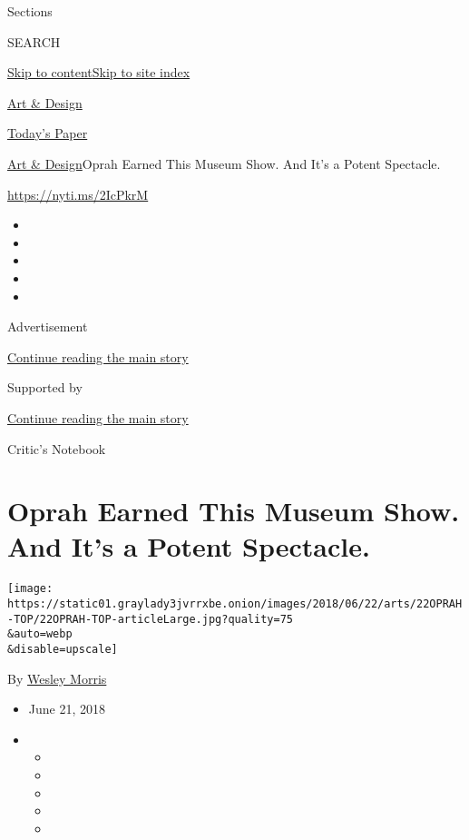 Sections

SEARCH

\protect\hyperlink{site-content}{Skip to
content}\protect\hyperlink{site-index}{Skip to site index}

\href{https://www.nytimes3xbfgragh.onion/section/arts/design}{Art \&
Design}

\href{https://myaccount.nytimes3xbfgragh.onion/auth/login?response_type=cookie\&client_id=vi}{}

\href{https://www.nytimes3xbfgragh.onion/section/todayspaper}{Today's
Paper}

\href{/section/arts/design}{Art \& Design}\textbar{}Oprah Earned This
Museum Show. And It's a Potent Spectacle.

\url{https://nyti.ms/2IcPkrM}

\begin{itemize}
\item
\item
\item
\item
\item
\end{itemize}

Advertisement

\protect\hyperlink{after-top}{Continue reading the main story}

Supported by

\protect\hyperlink{after-sponsor}{Continue reading the main story}

Critic's Notebook

\hypertarget{oprah-earned-this-museum-show-and-its-a-potent-spectacle}{%
\section{Oprah Earned This Museum Show. And It's a Potent
Spectacle.}\label{oprah-earned-this-museum-show-and-its-a-potent-spectacle}}

\texttt{[image: https://static01.graylady3jvrrxbe.onion/images/2018/06/22/arts/22OPRAH-TOP/22OPRAH-TOP-articleLarge.jpg?quality=75\\\&auto=webp\\\&disable=upscale]}

By \href{http://www.nytimes3xbfgragh.onion/by/wesley-morris}{Wesley
Morris}

\begin{itemize}
\item
  June 21, 2018
\item
  \begin{itemize}
  \item
  \item
  \item
  \item
  \item
  \end{itemize}
\end{itemize}

